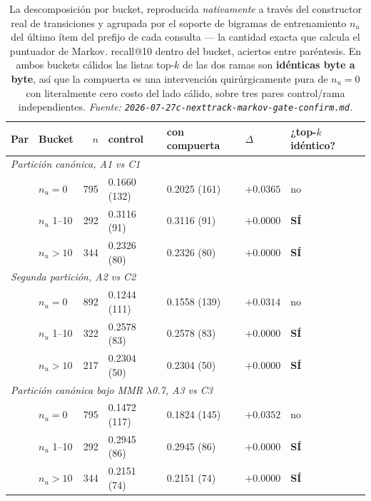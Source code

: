 \documentclass[11pt]{article}
\newcommand{\best}[1]{\textbf{#1}}
\begin{document}
\begin{table}[ht]
  \centering
  \caption{La descomposición por bucket, reproducida \emph{nativamente} a través
  del constructor real de transiciones y agrupada por el soporte de bigramas de
  entrenamiento $n_u$ del último ítem del prefijo de cada consulta --- la cantidad
  exacta que calcula el puntuador de Markov. recall@10 dentro del bucket, aciertos
  entre paréntesis. En ambos buckets cálidos las listas top-$k$ de las dos ramas
  son \textbf{idénticas byte a byte}, así que la compuerta es una intervención
  quirúrgicamente pura de $n_u=0$ con literalmente cero costo del lado cálido,
  sobre tres pares control/rama independientes.
  \emph{Fuente: \texttt{2026-07-27c-nexttrack-markov-gate-confirm.md}.}}
  \label{tab:markovgate-buckets}
  {\footnotesize\setlength{\tabcolsep}{5pt}\begin{tabular}{llrllll}
    \toprule
    Par & Bucket & $n$ & control & con compuerta & $\Delta$ & ¿top-$k$ idéntico? \\
    \midrule
    \multicolumn{7}{l}{\emph{Partición canónica, A1 vs C1}} \\
    & $n_u = 0$ & 795 & 0.1660 (132) & 0.2025 (161) & \best{$+0.0365$} & no \\
    & $n_u$ 1--10 & 292 & 0.3116 (91) & 0.3116 (91) & $+0.0000$ & \best{SÍ} \\
    & $n_u > 10$ & 344 & 0.2326 (80) & 0.2326 (80) & $+0.0000$ & \best{SÍ} \\
    \midrule
    \multicolumn{7}{l}{\emph{Segunda partición, A2 vs C2}} \\
    & $n_u = 0$ & 892 & 0.1244 (111) & 0.1558 (139) & \best{$+0.0314$} & no \\
    & $n_u$ 1--10 & 322 & 0.2578 (83) & 0.2578 (83) & $+0.0000$ & \best{SÍ} \\
    & $n_u > 10$ & 217 & 0.2304 (50) & 0.2304 (50) & $+0.0000$ & \best{SÍ} \\
    \midrule
    \multicolumn{7}{l}{\emph{Partición canónica bajo MMR $\lambda$0.7, A3 vs C3}} \\
    & $n_u = 0$ & 795 & 0.1472 (117) & 0.1824 (145) & \best{$+0.0352$} & no \\
    & $n_u$ 1--10 & 292 & 0.2945 (86) & 0.2945 (86) & $+0.0000$ & \best{SÍ} \\
    & $n_u > 10$ & 344 & 0.2151 (74) & 0.2151 (74) & $+0.0000$ & \best{SÍ} \\
    \bottomrule
  \end{tabular}}
\end{table}
\end{document}
